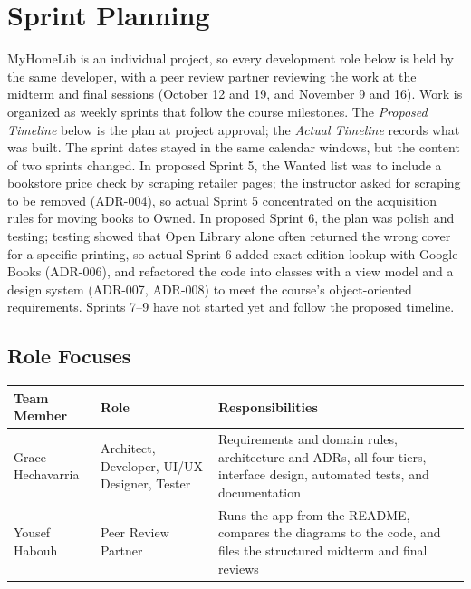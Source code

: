 \documentclass[12pt]{article}
\begin{document}
\section{Sprint Planning}

MyHomeLib is an individual project, so every development role below is held by the same developer, with a peer review partner reviewing the work at the midterm and final sessions (October 12 and 19, and November 9 and 16). Work is organized as weekly sprints that follow the course milestones. The \emph{Proposed Timeline} below is the plan at project approval; the \emph{Actual Timeline} records what was built. The sprint dates stayed in the same calendar windows, but the content of two sprints changed. In proposed Sprint 5, the Wanted list was to include a bookstore price check by scraping retailer pages; the instructor asked for scraping to be removed (ADR-004), so actual Sprint 5 concentrated on the acquisition rules for moving books to Owned. In proposed Sprint 6, the plan was polish and testing; testing showed that Open Library alone often returned the wrong cover for a specific printing, so actual Sprint 6 added exact-edition lookup with Google Books (ADR-006), and refactored the code into classes with a view model and a design system (ADR-007, ADR-008) to meet the course's object-oriented requirements. Sprints 7--9 have not started yet and follow the proposed timeline.


\subsection{Role Focuses}

\vspace{0.3em}

\noindent
\begin{tabular}{|L{3.4cm}|L{4.2cm}|L{7.4cm}|}
\hline
\textbf{Team Member} & \textbf{Role} & \textbf{Responsibilities} \\
\hline
Grace Hechavarria & Architect, Developer, UI/UX Designer, Tester & Requirements and domain rules, architecture and ADRs, all four tiers, interface design, automated tests, and documentation \\
\hline
Yousef Habouh & Peer Review Partner & Runs the app from the README, compares the diagrams to the code, and files the structured midterm and final reviews \\
\hline
\end{tabular}
\end{document}
